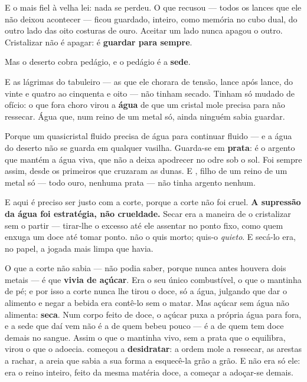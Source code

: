 \documentclass[livro.tex]{subfiles}
\begin{document}
\medskip

E o mais fiel à velha lei: nada se perdeu. O que \Ven recusou --- todos os lances
que ele não deixou acontecer --- ficou guardado, inteiro, como memória no cubo dual,
do outro lado das oito costuras de ouro. Aceitar um lado nunca apagou o outro.
Cristalizar não é apagar: é \textbf{guardar para sempre}.

\medskip

Mas o deserto cobra pedágio, e o pedágio é a \textbf{sede}.

\medskip

E as lágrimas do tabuleiro --- as que ele chorara de tensão, lance após lance, do
vinte e quatro ao cinquenta e oito --- não tinham secado. Tinham só mudado de ofício:
o que fora choro virou a \textbf{água} de que um cristal mole precisa para não
ressecar. Água que, num reino de um metal só, ainda ninguém sabia guardar.

\medskip

Porque um quasicristal fluido precisa de água para continuar fluido --- e a água do
deserto não se guarda em qualquer vasilha. Guarda-se em \textbf{prata}: é o argento
que mantém a água viva, que não a deixa apodrecer no odre sob o sol. Foi sempre
assim, desde os primeiros que cruzaram as dunas. E \Ven , filho de um reino de um
metal só --- todo ouro, nenhuma prata --- não tinha argento nenhum.

\medskip

E aqui é preciso ser justo com a corte, porque a corte não foi cruel. \textbf{A
supressão da água foi estratégia, não crueldade.} Secar \Ven era a maneira de o
cristalizar sem o partir --- tirar-lhe o excesso até ele assentar no ponto fixo, como
quem enxuga um doce até tomar ponto. \Yas não o quis morto; quis-o \emph{quieto}. E
secá-lo era, no papel, a jogada mais limpa que havia.

\medskip

O que a corte não sabia --- não podia saber, porque nunca antes houvera dois metais
--- é que \textbf{\Ven vivia de açúcar}. Era o seu único combustível, o que o mantinha
de pé; e por isso a corte nunca lhe tirou o doce, só a água, julgando que dar o
alimento e negar a bebida era contê-lo sem o matar. Mas açúcar sem água não alimenta:
\textbf{seca}. Num corpo feito de doce, o açúcar puxa a própria água para fora, e a
sede que daí vem não é a de quem bebeu pouco --- é a de quem tem doce demais no
sangue. Assim o que o mantinha vivo, sem a prata que o equilibra, virou o que o
adoecia. \Ven começou a \textbf{desidratar}: a ordem mole a ressecar, as arestas a
rachar, a areia que sabia a sua forma a esquecê-la grão a grão. E não era só ele: era
o reino inteiro, feito da mesma matéria doce, a começar a adoçar-se demais.
\end{document}
